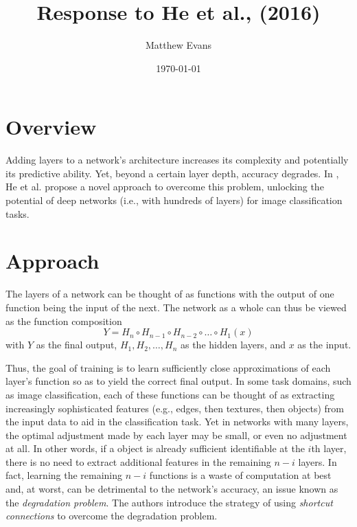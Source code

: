 \documentclass[10pt]{article}
\title{
    Response to He et al., (2016) \\
}
\author{Matthew Evans}
\date{\today}
\begin{document}
\maketitle

\section*{Overview}
Adding layers to a network's architecture increases its complexity and potentially its predictive ability. Yet, beyond a certain layer depth, accuracy degrades. In \cite{7780459},  He et al. propose a novel approach to overcome this problem, unlocking the potential of deep networks (i.e., with hundreds of layers) for image classification tasks.


\section*{Approach}

The layers of a network can be thought of as functions with the output of one function being the input of the next. The network as a whole can thus be viewed as the function composition
\[
    Y = H_n \circ H_{n-1}\circ H_{n-2} \circ \dots \circ H_{1}(x)
\]
with \(Y\) as the final output, \(H_1, H_2, \dots, H_{n}\) as the hidden layers, and \(x\) as the input.

Thus, the goal of training is to learn sufficiently close approximations of each layer's function so as to yield the correct final output. In some task domains, such as image classification, each of these functions can be thought of as extracting increasingly sophisticated features (e.g., edges, then textures, then objects) from the input data to aid in the classification task. Yet in networks with many layers, the optimal adjustment made by each layer may be small, or even no adjustment at all. In other words, if a object is already sufficient identifiable at the \(i\)th layer, there is no need to extract additional features in the remaining \(n-i\) layers. In fact, learning the remaining \(n-i\) functions is a waste of computation at best and, at worst, can be detrimental to the network's accuracy, an issue known as the \textit{degradation problem}. The authors introduce the strategy of using \textit{shortcut connections} to overcome the degradation problem.
\end{document}
